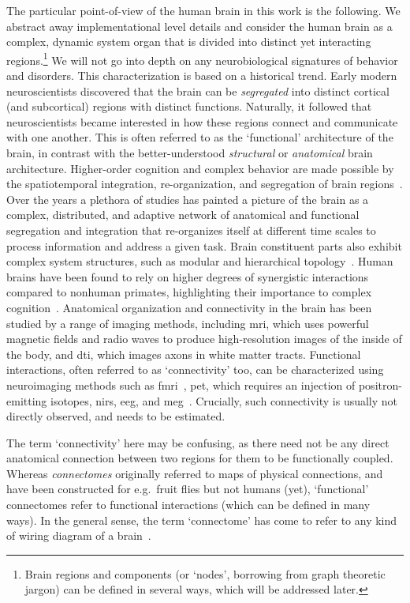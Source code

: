 The particular point-of-view of the human brain in this work is the following.
We abstract away implementational level details and consider the human brain as a complex, dynamic system organ that is divided into distinct yet interacting regions.\footnote{Brain regions and components (or `nodes', borrowing from graph theoretic jargon) can be defined in several ways, which will be addressed later.}
We will not go into depth on any neurobiological signatures of behavior and disorders.
%
This characterization is based on a historical trend.
Early modern neuroscientists discovered that the brain can be \emph{segregated} into distinct cortical (and subcortical) regions with distinct functions.
Naturally, it followed that neuroscientists became interested in how these regions connect and communicate with one another.
This is often referred to as the `functional' architecture of the brain, in contrast with the better-understood \emph{structural} or \emph{anatomical} brain architecture.
Higher-order cognition and complex behavior are made possible by the spatiotemporal integration, re-organization, and segregation of brain regions~\parencite{Deco2011}.
Over the years a plethora of studies has painted a picture of the brain as a complex, distributed, and adaptive network of anatomical and functional segregation and integration that re-organizes itself at different time scales to process information and address a given task.
Brain constituent parts also exhibit complex system structures, such as modular and hierarchical topology~\parencite{Meunier2009, Deco2015}.
Human brains have been found to rely on higher degrees of synergistic interactions compared to nonhuman primates, highlighting their importance to complex cognition~\parencite{Luppi2022}.
%
Anatomical organization and connectivity in the brain has been studied by a range of imaging methods, including \gls{mri}, which uses powerful magnetic fields and radio waves to produce high-resolution images of the inside of the body, and \gls{dti}, which images axons in white matter tracts.
Functional interactions, often referred to as `connectivity' too, can be characterized using neuroimaging methods such as \gls{fmri}~\parencite{Soares2016}, \gls{pet}, which requires an injection of positron-emitting isotopes, \gls{nirs}, \gls{eeg}, and \gls{meg}~\parencite{Rossini2019}.
Crucially, such connectivity is usually not directly observed, and needs to be estimated.

The term `connectivity' here may be confusing, as there need not be any direct anatomical connection between two regions for them to be functionally coupled.
Whereas \emph{connectomes} originally referred to maps of physical connections, and have been constructed for e.g.~fruit flies but not humans (yet), `functional' connectomes refer to functional interactions (which can be defined in many ways).
In the general sense, the term `connectome' has come to refer to any kind of wiring diagram of a brain~\parencite{Sporns2005}.

